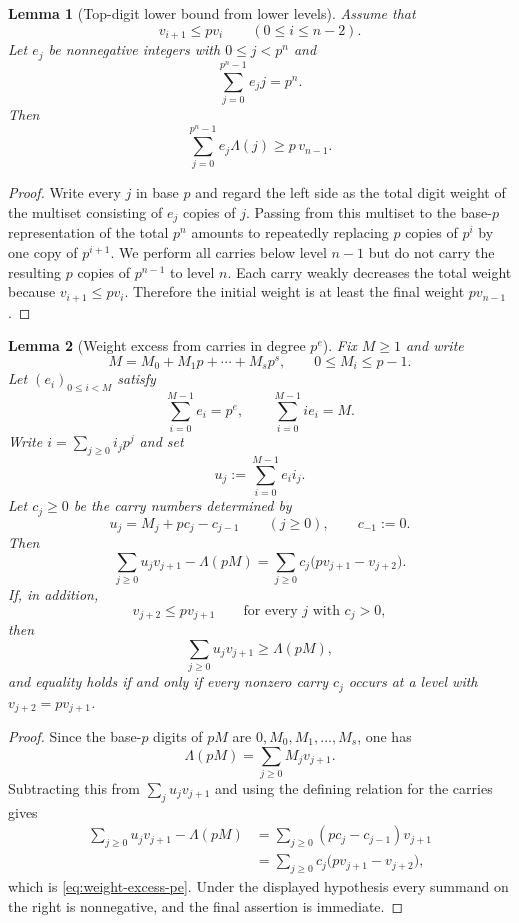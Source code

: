 \documentclass[11pt]{amsart}
\numberwithin{equation}{section}
\newtheorem{lemma}[lemma]{Lemma}
\begin{document}
\begin{lemma}[Top-digit lower bound from lower levels]\label{lem:top-digit-lower-pe}
Assume that
\[
        v_{i+1}\le p v_i\qquad (0\le i\le n-2).
\]
Let $e_j$ be nonnegative integers with $0\le j<p^n$ and
\[
        \sum_{j=0}^{p^n-1}e_jj=p^n.
\]
Then
\[
        \sum_{j=0}^{p^n-1}e_j\Lambda(j)\ge p\,v_{n-1}.
\]
\end{lemma}
\begin{proof}
Write every $j$ in base $p$ and regard the left side as the total digit weight of the multiset consisting of $e_j$ copies of $j$.  Passing from this multiset to the base-$p$ representation of the total $p^n$ amounts to repeatedly replacing $p$ copies of $p^i$ by one copy of $p^{i+1}$.  We perform all carries below level $n-1$ but do not carry the resulting $p$ copies of $p^{n-1}$ to level $n$.  Each carry weakly decreases the total weight because $v_{i+1}\le pv_i$.  Therefore the initial weight is at least the final weight $p v_{n-1}$.
\end{proof}

\begin{lemma}[Weight excess from carries in degree $p^e$]\label{lem:weight-excess-pe}
Fix $M\ge1$ and write
\[
        M=M_0+M_1p+\cdots+M_sp^s,\qquad 0\le M_i\le p-1.
\]
Let $(e_i)_{0\le i<M}$ satisfy
\[
        \sum_{i=0}^{M-1}e_i=p^e,
        \qquad
        \sum_{i=0}^{M-1}ie_i=M.
\]
Write $i=\sum_{j\ge0}i_jp^j$ and set
\[
        u_j:=\sum_{i=0}^{M-1}e_i i_j.
\]
Let $c_j\ge0$ be the carry numbers determined by
\[
        u_j=M_j+p c_j-c_{j-1}\qquad (j\ge0),\qquad c_{-1}:=0.
\]
Then
\begin{equation}\label{eq:weight-excess-pe}
        \sum_{j\ge0}u_jv_{j+1}-\Lambda(pM)
        =\sum_{j\ge0}c_j\bigl(pv_{j+1}-v_{j+2}\bigr).
\end{equation}
If, in addition,
\[
        v_{j+2}\le pv_{j+1}
        \qquad\text{for every }j\text{ with }c_j>0,
\]
then
\[
        \sum_{j\ge0}u_jv_{j+1}\ge \Lambda(pM),
\]
and equality holds if and only if every nonzero carry $c_j$ occurs at a level with $v_{j+2}=pv_{j+1}$.
\end{lemma}
\begin{proof}
Since the base-$p$ digits of $pM$ are $0,M_0,M_1,\ldots,M_s$, one has
\[
        \Lambda(pM)=\sum_{j\ge0}M_jv_{j+1}.
\]
Subtracting this from $\sum_j u_jv_{j+1}$ and using the defining relation for the carries gives
\[
\begin{aligned}
        \sum_{j\ge0}u_jv_{j+1}-\Lambda(pM)
        &=\sum_{j\ge0}(pc_j-c_{j-1})v_{j+1}\\
        &=\sum_{j\ge0}c_j\bigl(pv_{j+1}-v_{j+2}\bigr),
\end{aligned}
\]
which is \eqref{eq:weight-excess-pe}.  Under the displayed hypothesis every summand on the right is nonnegative, and the final assertion is immediate.
\end{proof}
\end{document}
